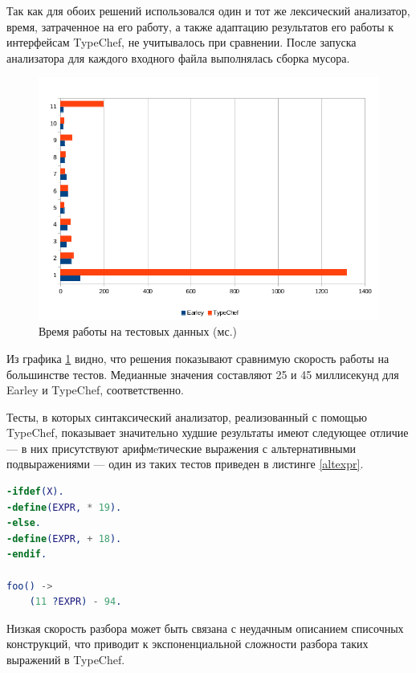 Так как для обоих решений использовался один и тот же лексический анализатор, время, затраченное на его работу, а также адаптацию результатов его работы к интерфейсам TypeChef, не учитывалось при сравнении. После запуска анализатора для каждого входного файла выполнялась сборка мусора.

\begin{figure}[h]
\includegraphics[width=\linewidth]{performance.png}
\caption{Время работы на тестовых данных (мс.)}
\label{chart}
\end{figure}

Из графика \ref{chart} видно, что решения показывают сравнимую скорость работы на большинстве тестов. Медианные значения составляют 25 и 45 миллисекунд для Earley и TypeChef, соответственно.

Тесты, в которых синтаксический анализатор, реализованный с помощью TypeChef, показывает значительно худшие результаты имеют следующее отличие --- в них присутствуют арифмeтические выражения с альтернативными подвыражениями --- один из таких тестов приведен в листинге \ref{altexpr}. 

\begin{minipage}{\linewidth}
\begin{lstlisting}[caption={Один из тестов с альтернативными подвыражениями},language=Erlang,label=altexpr]
-ifdef(X).
-define(EXPR, * 19).
-else.
-define(EXPR, + 18).
-endif.

foo() ->
    (11 ?EXPR) - 94.
\end{lstlisting}
\end{minipage}

Низкая скорость разбора может быть связана с неудачным описанием списочных конструкций, что приводит к экспоненциальной сложности разбора таких выражений в TypeChef.

